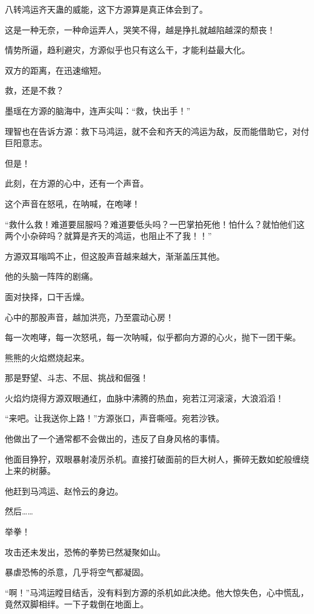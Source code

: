 
\begin{this_body}

八转鸿运齐天蛊的威能，这下方源算是真正体会到了。

这是一种无奈，一种命运弄人，哭笑不得，越是挣扎就越陷越深的颓丧！

情势所逼，趋利避灾，方源似乎也只有这么干，才能利益最大化。

双方的距离，在迅速缩短。

救，还是不救？

墨瑶在方源的脑海中，连声尖叫：“救，快出手！”

理智也在告诉方源：救下马鸿运，就不会和齐天的鸿运为敌，反而能借助它，对付巨阳意志。

但是！

此刻，在方源的心中，还有一个声音。

这个声音在怒吼，在呐喊，在咆哮！

“救什么救！难道要屈服吗？难道要低头吗？一巴掌拍死他！怕什么？就怕他们这两个小杂碎吗？就算是齐天的鸿运，也阻止不了我！！”

方源双耳嗡鸣不止，但这股声音越来越大，渐渐盖压其他。

他的头脑一阵阵的剧痛。

面对抉择，口干舌燥。

心中的那股声音，越加洪亮，乃至震动心房！

每一次咆哮，每一次怒吼，每一次呐喊，似乎都向方源的心火，抛下一团干柴。

熊熊的火焰燃烧起来。

那是野望、斗志、不屈、挑战和倔强！

火焰灼烧得方源双眼通红，血脉中沸腾的热血，宛若江河滚滚，大浪滔滔！

“来吧。让我送你上路！”方源张口，声音嘶哑。宛若沙铁。

他做出了一个通常都不会做出的，违反了自身风格的事情。

他面目狰狞，双眼暴射凌厉杀机。直接打破面前的巨大树人，撕碎无数如蛇般缠绕上来的树藤。

他赶到马鸿运、赵怜云的身边。

然后……

举拳！

攻击还未发出，恐怖的拳势已然凝聚如山。

暴虐恐怖的杀意，几乎将空气都凝固。

“啊！”马鸿运瞠目结舌，没有料到方源的杀机如此决绝。他大惊失色，心中慌乱，竟然双脚相绊。一下子栽倒在地面上。


\end{this_body}
